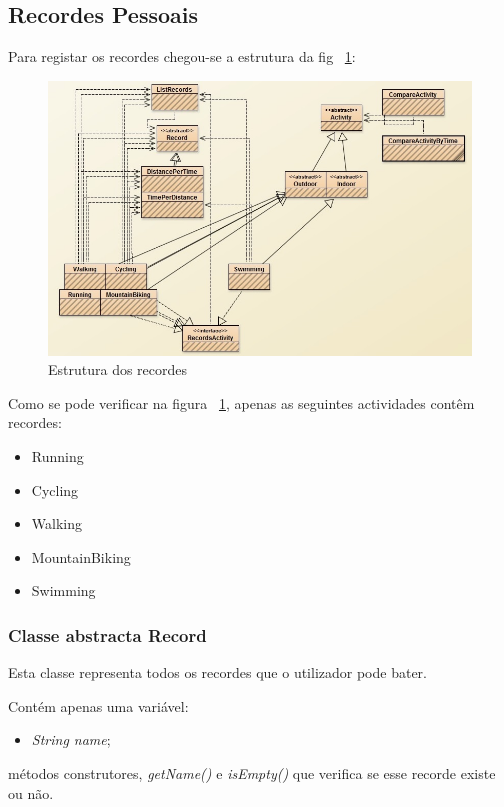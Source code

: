 \documentclass[10pt,notitlepage]{article}
\begin{document}
\subsection{Recordes Pessoais}
Para registar os recordes chegou-se a estrutura da fig ~\ref{fig:recordes}:
~\\
\begin{figure}[h]
\centering
\includegraphics[scale=0.6]{Records.jpg}
\caption{Estrutura dos recordes}
\label{fig:recordes}
\end{figure}


Como se pode verificar na figura ~\ref{fig:recordes}, apenas as seguintes actividades contêm recordes:
\begin{itemize}
\item Running
\item Cycling
\item Walking
\item MountainBiking
\item Swimming
\end{itemize} 


\subsubsection{Classe abstracta Record}

Esta classe representa todos os recordes que o utilizador pode bater.



 Contém apenas uma variável:
\begin{itemize}
\item \textit{String name};
\end{itemize}
métodos construtores, \textit{getName()} e \textit{isEmpty()} que verifica se esse recorde existe ou não.
\end{document}

